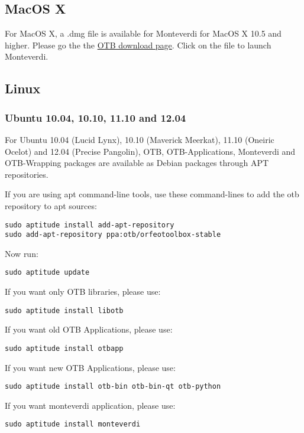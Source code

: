 \subsection{MacOS X}
\label{ssec:mac_binaries}

For MacOS X, a .dmg file is available for Monteverdi for MacOS X 10.5 and higher. 
Please go the the \href{http://sourceforge.net/projects/orfeo-toolbox/}{OTB download page}.
Click on the file to launch Monteverdi.

\subsection{Linux}

\subsubsection{Ubuntu 10.04, 10.10, 11.10 and 12.04}
\label{ssec:ubuntu_binaries}
For Ubuntu 10.04 (Lucid Lynx), 10.10 (Maverick Meerkat), 11.10 (Oneiric Ocelot) and 12.04 (Precise Pangolin), OTB, 
OTB-Applications, Monteverdi and OTB-Wrapping packages are available as Debian packages 
through APT repositories.

If you are using apt command-line tools, use these command-lines to add the otb repository to apt sources:
\begin{verbatim}
sudo aptitude install add-apt-repository 
sudo add-apt-repository ppa:otb/orfeotoolbox-stable
\end{verbatim}
Now run:
\begin{verbatim}
sudo aptitude update
\end{verbatim}
If you want only OTB libraries, please use:
\begin{verbatim}
sudo aptitude install libotb
\end{verbatim}

If you want old OTB Applications, please use:
\begin{verbatim}
sudo aptitude install otbapp
\end{verbatim}

If you want new OTB Applications, please use:
\begin{verbatim}
sudo aptitude install otb-bin otb-bin-qt otb-python
\end{verbatim}

If you want monteverdi application, please use:
\begin{verbatim}
sudo aptitude install monteverdi
\end{verbatim}

